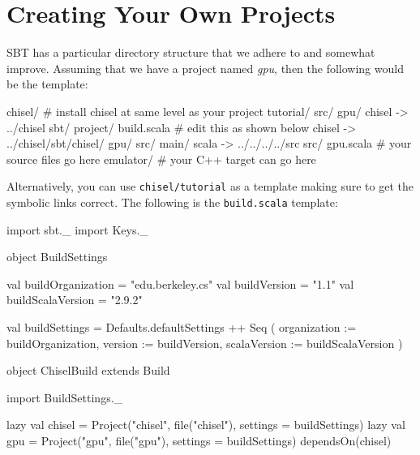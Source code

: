 \documentclass[twocolumn, 10pt]{article}
\begin{document}

\section{Creating Your Own Projects}

SBT has a particular directory structure that we adhere to and
somewhat improve.  Assuming that we have a project named {\em gpu},
then the following would be the template:

\begin{bash}
chisel/           # install chisel at same level as your project
  tutorial/
  src/
gpu/
  chisel -> ../chisel
  sbt/
    project/
      build.scala # edit this as shown below
    chisel -> ../chisel/sbt/chisel/
    gpu/
      src/
        main/
          scala -> ../../../../src
  src/ 
    gpu.scala # your source files go here
  emulator/   # your C++ target can go here
\end{bash}

Alternatively, you can use \verb+chisel/tutorial+ as a template making
sure to get the symbolic links correct.
The following is the \verb+build.scala+ template:

\begin{scala}
import sbt._
import Keys._

object BuildSettings {
  val buildOrganization = "edu.berkeley.cs"
  val buildVersion = "1.1"
  val buildScalaVersion = "2.9.2"

  val buildSettings = Defaults.defaultSettings ++ Seq (
    organization := buildOrganization,
    version      := buildVersion,
    scalaVersion := buildScalaVersion
  )
}

object ChiselBuild extends Build {
  import BuildSettings._

  lazy val chisel = 
    Project("chisel", file("chisel"), 
            settings = buildSettings)
  lazy val gpu =
    Project("gpu", file("gpu"), 
            settings = buildSettings) 
      dependsOn(chisel)
}
\end{scala}
\end{document}
